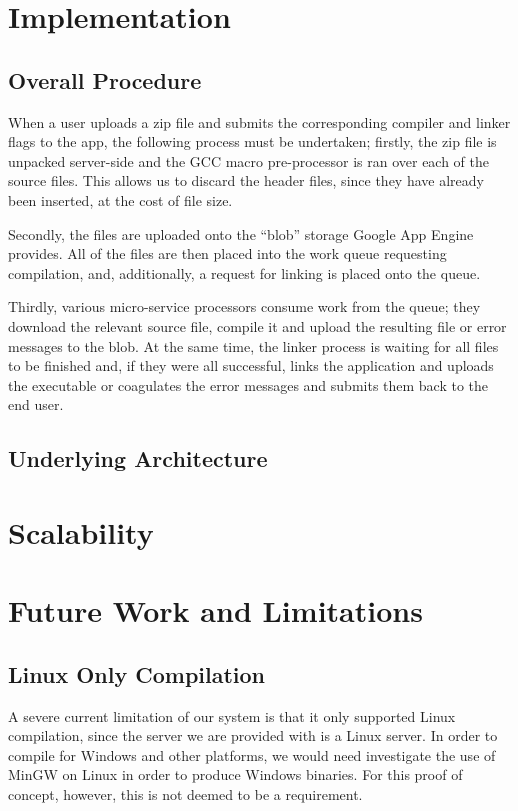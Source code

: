 \documentclass[conference]{IEEEtran}
\begin{document}

\section{Implementation}
\subsection{Overall Procedure}
When a user uploads a zip file and submits the corresponding compiler and linker
flags to the app, the following process must be undertaken; firstly, the zip
file is unpacked server-side and the GCC macro pre-processor is ran over each of
the source files. This allows us to discard the header files, since they have
already been inserted, at the cost of file size. 

Secondly, the files are uploaded onto the ``blob'' storage Google App Engine
provides. All of the files are then placed into the work queue requesting
compilation, and, additionally, a request for linking is placed onto the queue.

Thirdly, various micro-service processors consume work from the queue; they
download the relevant source file, compile it and upload the resulting file or
error messages to the blob. At the same time, the linker process is waiting for
all files to be finished and, if they were all successful, links the
application and uploads the executable or coagulates the error messages and
submits them back to the end user.
\subsection{Underlying Architecture}
\section{Scalability}
\section{Future Work and Limitations}
\subsection{Linux Only Compilation}
A severe current limitation of our system is that it only supported Linux
compilation, since the server we are provided with is a Linux server. In order
to compile for Windows and other platforms, we would need investigate the use of
MinGW on Linux in order to produce Windows binaries. For this proof of concept,
however, this is not deemed to be a requirement.
\end{document}
